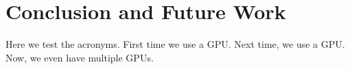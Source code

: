 \section{Conclusion and Future Work}\label{Sec:ConclusionAndFutureWork}

Here we test the acronyms.
First time we use a \ac{GPU}.
Next time, we use a \ac{GPU}.
Now, we even have multiple \acp{GPU}.

\lipsum[1-64]

